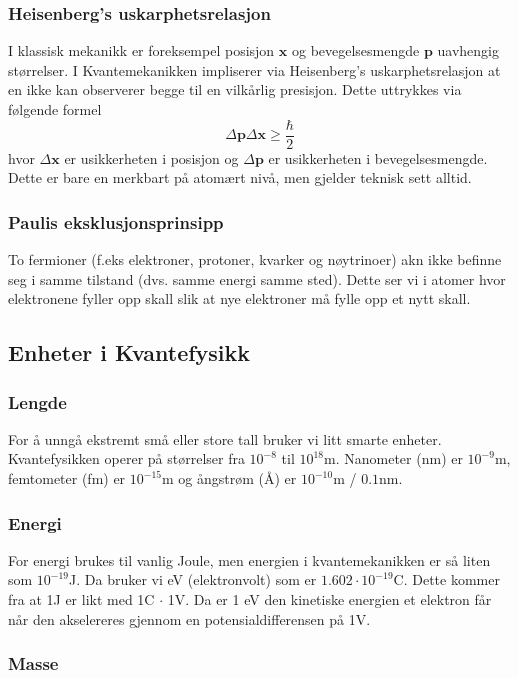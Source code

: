 \documentclass{article}
\begin{document}
\subsubsection*{Heisenberg's uskarphetsrelasjon}
I klassisk mekanikk er foreksempel posisjon $ \mathbf{x} $ og bevegelsesmengde $ \mathbf{p} $ uavhengig størrelser. I Kvantemekanikken impliserer via Heisenberg's uskarphetsrelasjon at en ikke kan observerer begge til en vilkårlig presisjon. Dette uttrykkes via følgende formel
\[
Δ \mathbf{p} Δ\mathbf{x} \geq \frac{ℏ}{2}
\]
hvor $ Δ\mathbf{x} $ er usikkerheten i posisjon og $ Δ\mathbf{p} 
$ er usikkerheten i bevegelsesmengde. Dette er bare en merkbart på atomært nivå, men gjelder teknisk sett alltid. 

\subsubsection*{Paulis eksklusjonsprinsipp}
To fermioner (f.eks elektroner, protoner, kvarker og nøytrinoer) akn ikke befinne seg i samme tilstand (dvs. samme energi samme sted). Dette ser vi i atomer hvor elektronene fyller opp skall slik at nye elektroner må fylle opp et nytt skall. 



\subsection{Enheter i Kvantefysikk}
\subsubsection*{Lengde}
For å unngå ekstremt små eller store tall bruker vi litt smarte enheter. Kvantefysikken operer på størrelser fra $ 10^{-8} $ til $ 10^{18} $m. Nanometer (nm) er $ 10^{-9} $m, femtometer (fm) er $ 10^{-15} $m og ångstrøm (Å) er $ 10^{-10} $m / $ 0.1 $nm.

\subsubsection*{Energi}
For energi brukes til vanlig Joule, men energien i kvantemekanikken er så liten som $ 10^{-19} $J. Da bruker vi eV (elektronvolt) som er $ 1.602 \cdot 10^{-19} $C. Dette kommer fra at 1J er likt med 1C $\cdot$ 1V. Da er 1 eV den kinetiske energien et elektron får når den akselereres gjennom en potensialdifferensen på 1V. 

\subsubsection*{Masse}
\end{document}
